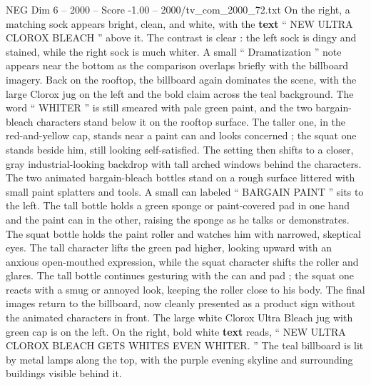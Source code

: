 \begin{textsample}{NEG Dim 6 – 2000 – Score -1.00 – 2000/tv\_com\_2000\_72.txt}
On the right, a matching sock appears bright, clean, and white, with the \textbf{text} “ NEW ULTRA CLOROX BLEACH ” above it.
The contrast is clear : the left sock is dingy and stained, while the right sock is much whiter.
A small “ Dramatization ” note appears near the bottom as the comparison overlaps briefly with the billboard imagery.
Back on the rooftop, the billboard again dominates the scene, with the large Clorox jug on the left and the bold claim across the teal background.
The word “ WHITER ” is still smeared with pale green paint, and the two bargain-bleach characters stand below it on the rooftop surface.
The taller one, in the red-and-yellow cap, stands near a paint can and looks concerned ; the squat one stands beside him, still looking self-satisfied.
The setting then shifts to a closer, gray industrial-looking backdrop with tall arched windows behind the characters.
The two animated bargain-bleach bottles stand on a rough surface littered with small paint splatters and tools.
A small can labeled “ BARGAIN PAINT ” sits to the left.
The tall bottle holds a green sponge or paint-covered pad in one hand and the paint can in the other, raising the sponge as he talks or demonstrates.
The squat bottle holds the paint roller and watches him with narrowed, skeptical eyes.
The tall character lifts the green pad higher, looking upward with an anxious open-mouthed expression, while the squat character shifts the roller and glares.
The tall bottle continues gesturing with the can and pad ; the squat one reacts with a smug or annoyed look, keeping the roller close to his body.
The final images return to the billboard, now cleanly presented as a product sign without the animated characters in front.
The large white Clorox Ultra Bleach jug with green cap is on the left.
On the right, bold white \textbf{text} reads, “ NEW ULTRA CLOROX BLEACH GETS WHITES EVEN WHITER. ” The teal billboard is lit by metal lamps along the top, with the purple evening skyline and surrounding buildings visible behind it.

\end{textsample}
